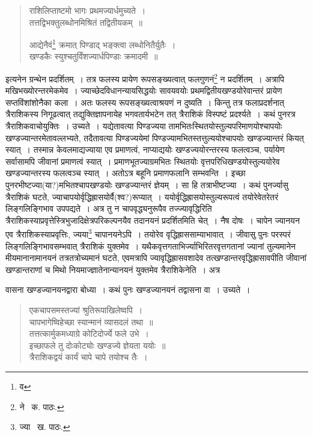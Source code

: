 \documentclass[11pt, openany]{book}
\begin{document}
\newpage


\begin{quote}
{\qt राशिलिप्ताष्टमो भागः प्रथमज्यार्धमुच्यते~।\\
तत्तद्विभक्तुलब्धोनमिश्रितं तद्वितीयकम्~॥

आद्येनैवं\renewcommand{\thefootnote}{१}\footnote{व} क्रमात् पिण्डाद् भङ्क्त्वा लब्धोनितैर्युतैः~।\\
खण्डकैः स्युश्चतुर्विंशज्यार्धपिण्डाः क्रमादमी~॥}
\end{quote}

\noindent इत्यनेन ग्रन्थेन प्रदर्शितम्~। तत्र फलस्य प्रायेण रूपसङ्ख्यत्वात् फलगुणनं\renewcommand{\thefootnote}{२}\footnote{ने \textendash\ क. पाठः.} न प्रदर्शितम्~। अत्रापि मखिभख्योरन्तरमेकमेव~। ज्याच्छेदविधानन्यायसिद्धयोः सावयवयोः प्रथमद्वितीयखण्डयोरेवान्तरं प्रायेण सप्तविंशांशोनैका कला~। अतः फलस्य रूपसङ्ख्यत्वाश्रयणं न दुष्यति~। किन्तु तत्र फलाप्रदर्शनात् त्रैराशिकस्य निगूढत्वात् तद्युक्तिज्ञापनायेह भगवतार्यभटेन तत् त्रैराशिकं विस्पष्टं प्रदर्श्यते~। कथं पुनरत्र त्रैराशिकवाचोयुक्तिः~। उच्यते~। यद्येतावत्या पिण्डज्यया तामभितःस्थितयोस्तुल्यपरिमाणयोश्चापयोः खण्डज्यान्तरमेतावल्लभ्यते, तदैतावत्या पिण्डज्ययेमां पिण्डज्यामभितस्तत्तुल्ययोश्चापयोः खण्डज्यान्तरं कियत् स्यात्~। तस्मान्न केवलमाद्यज्याया एव प्रमाणत्वं, नाप्याद्ययोः खण्डज्ययोरन्तरस्य फलत्वञ्च, पर्यायेण सर्वासामपि जीवानां प्रमाणत्वं स्यात्~। प्रमाणभूतज्याग्रमभितः स्थितयोः वृत्तपरिधिखण्डयोस्तुल्ययोरेव खण्डज्यान्तरस्य फलत्वञ्च स्यात्~। अतोऽत्र बहूनि प्रमाणफलानि सम्भवन्ति~। इच्छा पुनरभीष्टज्या(या?)मभितश्चापखण्डयोः खण्डज्यान्तरं ज्ञेयम्~। सा हि तत्राभीष्टज्या~। कथं पुनर्ज्यासु त्रैराशिकं घटते, ज्याचापयोर्वृद्धिह्रासयोर्वै(श्व?)रूप्यात्~। ययोर्वृद्धिह्रासयोस्तुल्यरूपत्वं तयोरेवेतरेतरं लिङ्गलिङ्गिभाव उपपद्यते~। अत्र तु न चापवृद्ध्यनुरूपैव तज्ज्यावृद्धिरिति त्रैराशिकस्याप्रवृत्तेस्त्रिभुजादिक्षेत्रपरिकल्पनयैव तदानयनं प्रदर्शितमिति
चेत्~। नैष दोषः~। चापेन ज्यानयन एव त्रैराशिकस्याप्रवृत्तिः, ज्यया\renewcommand{\thefootnote}{३}\footnote{ज्या \textendash\ ख. पाठः.} चापानयनेऽपि~। तयोरेव वृद्धिह्राससाम्याभावात्~। जीवासु पुनः परस्परं लिङ्गलिङ्गिभावसम्भवात् त्रैराशिकं युक्तमेव~। यथैकवृत्तगताभिर्ज्याभिरितरवृत्तगतानां ज्यानां तुल्यमानेन मीयमानानामानयनं तत्रतत्रोच्यमानं घटते, एवमत्रापि ज्यावृद्धिह्रासवशादेव तत्खण्डान्तरवृद्धिह्रासावपीति जीवानां खण्डान्तराणां च मिथो नियमाज्ज्ञातेनान्यानयनं युक्तमेव त्रैराशिकेनेति~। अत्र 

\newpage

\noindent वासना खण्डज्यानयनद्वारा बोध्या~। कथं पुनः खण्डज्यानयनं तद्वासना वा~। उच्यते~।

\begin{quote}
{\qt एकचापसमस्तज्यां श्रुतिरूपाखिलेष्वपि~।\\
चापभागेष्विहेच्छा स्यान्मानं व्यासदलं तथा~॥\\
तत्तत्कार्मुकमध्याग्रे कोटिदोर्ज्ये फले उभे~।\\
इच्छाफले तु दोःकोट्योः खण्डज्ये ज्ञेयता ययोः~॥\\
त्रैराशिकद्वयं कार्यं चापे चापे तयोश्च तैः~।}
\end{quote}
\end{document}
